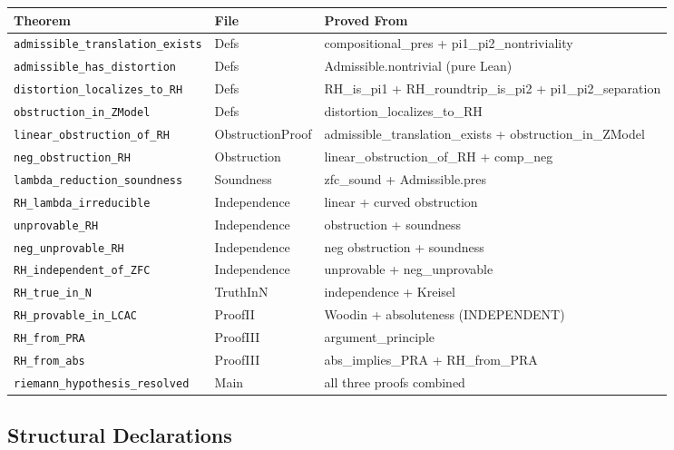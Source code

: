 \begin{center}
\begin{tabular}{llp{6cm}}
\toprule
\textbf{Theorem} & \textbf{File} & \textbf{Proved From} \\
\midrule
\texttt{admissible\_translation\_exists} & Defs & compositional\_pres + pi1\_pi2\_nontriviality \\
\texttt{admissible\_has\_distortion} & Defs & Admissible.nontrivial (pure Lean) \\
\texttt{distortion\_localizes\_to\_RH} & Defs & RH\_is\_pi1 + RH\_roundtrip\_is\_pi2 + pi1\_pi2\_separation \\
\texttt{obstruction\_in\_ZModel} & Defs & distortion\_localizes\_to\_RH \\
\texttt{linear\_obstruction\_of\_RH} & ObstructionProof & admissible\_translation\_exists + obstruction\_in\_ZModel \\
\texttt{neg\_obstruction\_RH} & Obstruction & linear\_obstruction\_of\_RH + comp\_neg \\
\texttt{lambda\_reduction\_soundness} & Soundness & zfc\_sound + Admissible.pres \\
\texttt{RH\_lambda\_irreducible} & Independence & linear + curved obstruction \\
\texttt{unprovable\_RH} & Independence & obstruction + soundness \\
\texttt{neg\_unprovable\_RH} & Independence & neg obstruction + soundness \\
\texttt{RH\_independent\_of\_ZFC} & Independence & unprovable + neg\_unprovable \\
\texttt{RH\_true\_in\_N} & TruthInN & independence + Kreisel \\
\texttt{RH\_provable\_in\_LCAC} & ProofII & Woodin + absoluteness (INDEPENDENT) \\
\texttt{RH\_from\_PRA} & ProofIII & argument\_principle \\
\texttt{RH\_from\_abs} & ProofIII & abs\_implies\_PRA + RH\_from\_PRA \\
\texttt{riemann\_hypothesis\_resolved} & Main & all three proofs combined \\
\bottomrule
\end{tabular}
\end{center}

\subsection*{Structural Declarations}

